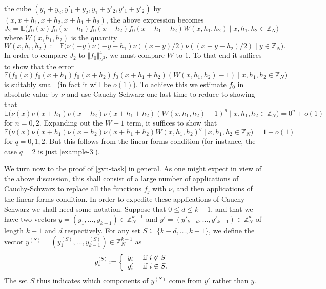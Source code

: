 \documentclass[12pt,a4paper,reqno]{amsart}
\numberwithin{equation}{section}
\theoremstyle{plain}
\theoremstyle{definition}
\renewcommand{\leq}{\leqslant}
\def\Z{{\mathbb Z}}
\def\E{{\mathbb E}}
\def\vs{\vspace{11pt}}
\def\ni{\noindent}
\begin{document}
the cube $(y_1+y_2,y'_1+y_2,y_1+y'_2,y'_1+y'_2)$ by $(x,x+h_1,x+h_2,x+h_1+h_2)$, the above expression becomes
$$ J_2 = \E\big( f_0(x) f_0(x+h_1) f_0(x+h_2) f_0(x+h_1+h_2) W(x,h_1,h_2) \;  \big| \; 
x,h_1,h_2 \in \mathbb{Z}_N \big)$$
where $W(x,h_1,h_2)$ is the quantity
\begin{equation}\label{WEIGHT-def}
 W(x,h_1,h_2) := \E\big( \nu(-y) \nu(-y-h_1) \nu((x-y)/2) \nu((x-y-h_2)/2) \; | \; y \in \Z_N \big).
 \end{equation}
 In order to compare $J_2$ to $\Vert f_0 \Vert_{U^2}^4$, we must compare $W$ to $1$. To that end it suffices to show that the error
$$ \E\big( f_0(x) f_0(x+h_1) f_0(x+h_2) f_0(x+h_1+h_2) (W(x,h_1,h_2)-1) \;  \big| \; 
x,h_1,h_2 \in \mathbb{Z}_N \big)$$
is suitably small (in fact it will be $o(1)$).  To achieve this we estimate $f_0$ in absolute value by $\nu$ and use Cauchy-Schwarz one last time
to reduce to showing that
$$ \E\big( \nu(x) \nu(x+h_1) \nu(x+h_2) \nu(x+h_1+h_2) (W(x,h_1,h_2)-1)^n \;  \big| \; 
x,h_1,h_2 \in \mathbb{Z}_N \big) = 0^n + o(1)$$
for $n=0,2$. Expanding out the $W-1$ term, it suffices to show that
$$ \E\big( \nu(x) \nu(x+h_1) \nu(x+h_2) \nu(x+h_1+h_2) W(x,h_1,h_2)^q \;  \big| \; 
x,h_1,h_2 \in \mathbb{Z}_N \big) = 1+o(1)$$
for $q=0,1,2$.  But this follows from the linear forms condition (for instance, the case $q=2$ is just \eqref{example-3}).\vs

\ni We turn now to the proof of \eqref{gvn-task} in general. As one might expect in view of the above discussion, this shall consist of a large number of applications
of Cauchy-Schwarz to replace all the functions $f_j$ with $\nu$, and then applications of the linear forms condition.
In order to expedite these applications of Cauchy-Schwarz we shall need some notation.
Suppose that $0 \leq d \leq k-1$, and that we have
two vectors $y = (y_1,\ldots,y_{k-1}) \in \Z_N^{k-1}$ and
$y' = (y'_{k-d},\ldots,y'_{k-1}) \in \Z_N^d$ of length $k-1$ and $d$
respectively.  For any set $S \subseteq \{k-d,\ldots,k-1\}$, we define the vector $y^{(S)} = (y^{(S)}_1, \ldots, y^{(S)}_{k-1})
\in \Z_N^{k-1}$ as 
$$ y^{(S)}_i := \left\{ \begin{array}{ll}
y_i &\hbox{ if } i \not \in S \\
y'_i &\hbox{ if } i \in S.
\end{array}\right.$$
The set $S$ thus indicates which components of $y^{(S)}$ come from $y'$ rather
than $y$.
\end{document}
